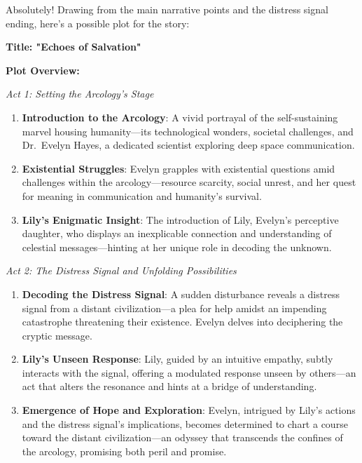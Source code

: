 \begin{aquote}
    Absolutely! Drawing from the main narrative points and the distress signal ending, here's a possible plot for the story:\medskip

    \noindent\textbf{Title: "Echoes of Salvation"}\medskip

    \noindent\textbf{Plot Overview:}\smallskip

    \noindent\emph{Act 1: Setting the Arcology's Stage}
    \begin{enumerate}
        \item \textbf{Introduction to the Arcology}: A vivid portrayal of the self-sustaining marvel housing humanity—its technological wonders, societal challenges, and Dr.~Evelyn Hayes, a dedicated scientist exploring deep space communication.
        \item \textbf{Existential Struggles}: Evelyn grapples with existential questions amid challenges within the arcology—resource scarcity, social unrest, and her quest for meaning in communication and humanity's survival.
        \item \textbf{Lily's Enigmatic Insight}: The introduction of Lily, Evelyn's perceptive daughter, who displays an inexplicable connection and understanding of celestial messages—hinting at her unique role in decoding the unknown.
    \end{enumerate}

    \noindent\emph{Act 2: The Distress Signal and Unfolding Possibilities}
    \begin{enumerate}
        \item \textbf{Decoding the Distress Signal}: A sudden disturbance reveals a distress signal from a distant civilization—a plea for help amidst an impending catastrophe threatening their existence. Evelyn delves into deciphering the cryptic message.
        \item \textbf{Lily's Unseen Response}: Lily, guided by an intuitive empathy, subtly interacts with the signal, offering a modulated response unseen by others—an act that alters the resonance and hints at a bridge of understanding.
        \item \textbf{Emergence of Hope and Exploration}: Evelyn, intrigued by Lily's actions and the distress signal's implications, becomes determined to chart a course toward the distant civilization—an odyssey that transcends the confines of the arcology, promising both peril and promise.
    \end{enumerate}


\end{aquote}

